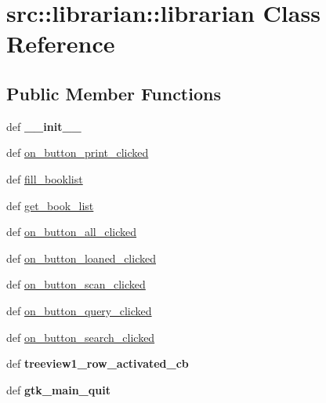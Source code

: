\hypertarget{classsrc_1_1librarian_1_1librarian}{
\section{src::librarian::librarian Class Reference}
\label{classsrc_1_1librarian_1_1librarian}
}
\subsection*{Public Member Functions}
\begin{DoxyCompactItemize}
\item 
\hypertarget{classsrc_1_1librarian_1_1librarian_acf3949b5b74bcec9e6571f1cfa212bcb}{
def {\bfseries \_\-\_\-init\_\-\_\-}}
\label{classsrc_1_1librarian_1_1librarian_acf3949b5b74bcec9e6571f1cfa212bcb}

\item 
def \hyperlink{classsrc_1_1librarian_1_1librarian_a4f28ce0f2370c18156999d082b143c59}{on\_\-button\_\-print\_\-clicked}
\item 
def \hyperlink{classsrc_1_1librarian_1_1librarian_a5a0ac477e38c817b334dcc02460072d8}{fill\_\-booklist}
\item 
def \hyperlink{classsrc_1_1librarian_1_1librarian_a172f1724b10cc6d2b0b490e578680e8d}{get\_\-book\_\-list}
\item 
def \hyperlink{classsrc_1_1librarian_1_1librarian_a972a2c91d3934db4763434ad294a7d56}{on\_\-button\_\-all\_\-clicked}
\item 
def \hyperlink{classsrc_1_1librarian_1_1librarian_a87655d7021f49aaea50dfb6191e2867e}{on\_\-button\_\-loaned\_\-clicked}
\item 
def \hyperlink{classsrc_1_1librarian_1_1librarian_aac059ba0d6c27ca605267ce116bc0e05}{on\_\-button\_\-scan\_\-clicked}
\item 
def \hyperlink{classsrc_1_1librarian_1_1librarian_a61a6cbccd578bf9f88a27667709813bf}{on\_\-button\_\-query\_\-clicked}
\item 
def \hyperlink{classsrc_1_1librarian_1_1librarian_a07feb9f46d60a453a685f47a975b8644}{on\_\-button\_\-search\_\-clicked}
\item 
\hypertarget{classsrc_1_1librarian_1_1librarian_a6afbd844c393f443263bb9f1e26f92a5}{
def {\bfseries treeview1\_\-row\_\-activated\_\-cb}}
\label{classsrc_1_1librarian_1_1librarian_a6afbd844c393f443263bb9f1e26f92a5}

\item 
\hypertarget{classsrc_1_1librarian_1_1librarian_a71bda0bd58fc1e317888bc9f641c3d4b}{
def {\bfseries gtk\_\-main\_\-quit}}
\label{classsrc_1_1librarian_1_1librarian_a71bda0bd58fc1e317888bc9f641c3d4b}

\end{DoxyCompactItemize}
